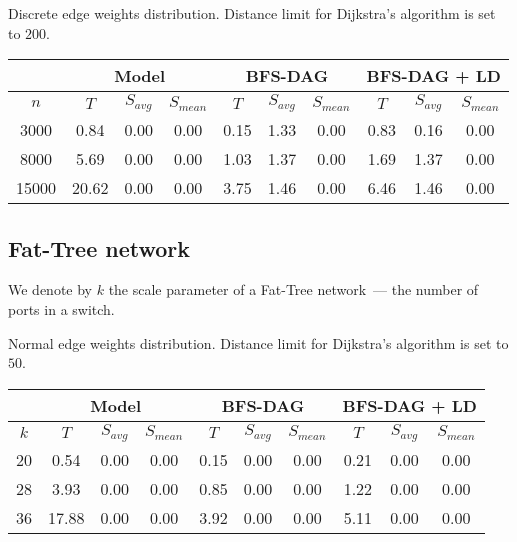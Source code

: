 \bigskip

Discrete edge weights distribution. Distance limit for Dijkstra's algorithm is set to $200$.

\smallskip

\bgroup
\def\arraystretch{1.5}
\begin{tabular}{ |c|c|c|c|c|c|c|c|c|c| } 

\hline
& \multicolumn{3}{|c|}{Model}
& \multicolumn{3}{|c|}{BFS-DAG}
& \multicolumn{3}{|c|}{BFS-DAG + LD} \\

\hline
$n$
& $T$ & $S_{avg}$ & $S_{mean}$
& $T$ & $S_{avg}$ & $S_{mean}$
& $T$ & $S_{avg}$ & $S_{mean}$ \\

\hline
3000
& 0.84 & 0.00 & 0.00
& 0.15 & 1.33 & 0.00
& 0.83 & 0.16 & 0.00 \\

\hline
8000
& 5.69 & 0.00 & 0.00
& 1.03 & 1.37 & 0.00
& 1.69 & 1.37 & 0.00 \\

\hline
15000
& 20.62 & 0.00 & 0.00
& 3.75 & 1.46 & 0.00
& 6.46 & 1.46 & 0.00 \\

\hline
\end{tabular}
\egroup

\subsection{Fat-Tree network}

We denote by $k$ the scale parameter of a Fat-Tree network~--- the number of ports in a switch.

Normal edge weights distribution. Distance limit for Dijkstra's algorithm is set to $50$.

\smallskip

\bgroup
\def\arraystretch{1.5}
\begin{tabular}{ |c|c|c|c|c|c|c|c|c|c| } 

\hline
& \multicolumn{3}{|c|}{Model}
& \multicolumn{3}{|c|}{BFS-DAG}
& \multicolumn{3}{|c|}{BFS-DAG + LD} \\

\hline
$k$
& $T$ & $S_{avg}$ & $S_{mean}$
& $T$ & $S_{avg}$ & $S_{mean}$
& $T$ & $S_{avg}$ & $S_{mean}$ \\

\hline
20
& 0.54 & 0.00 & 0.00
& 0.15 & 0.00 & 0.00
& 0.21 & 0.00 & 0.00 \\

\hline
28
& 3.93 & 0.00 & 0.00
& 0.85 & 0.00 & 0.00
& 1.22 & 0.00 & 0.00 \\

\hline
36
& 17.88 & 0.00 & 0.00
& 3.92 & 0.00 & 0.00
& 5.11 & 0.00 & 0.00 \\

\hline
\end{tabular}
\egroup

